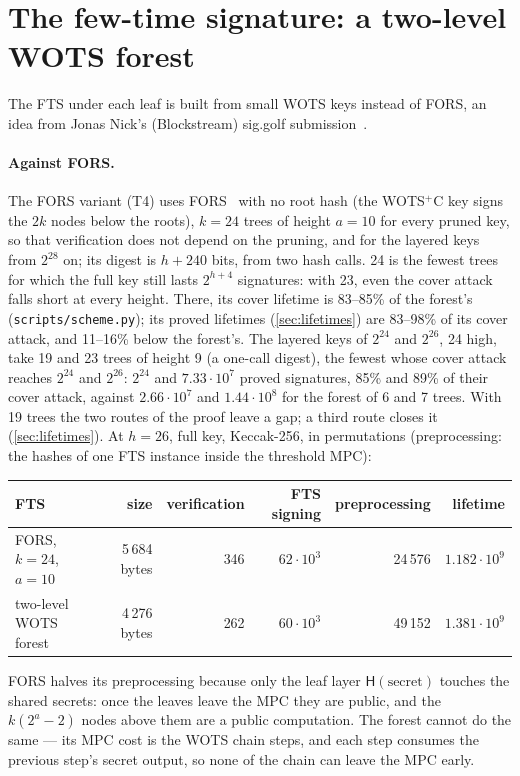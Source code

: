 \documentclass[11pt]{article}
\newcommand{\hash}{\mathsf{H}}
\begin{document}
\section{The few-time signature: a two-level WOTS forest}
\label{sec:twolevel}

The FTS under each leaf is built from small WOTS keys instead of FORS, an idea from Jonas Nick's (Blockstream)
sig.golf submission~\cite{siggolf}.

\paragraph{Against FORS.} The FORS variant (T4) uses FORS~\cite{FIPS205} with no root hash (the WOTS$^+$C key signs
the $2k$ nodes below the roots), $k=24$ trees of height $a=10$ for every pruned key, so that verification does
not depend on the pruning, and for the layered keys from $2^{28}$ on; its digest is $h+240$ bits, from two hash calls.
24 is the fewest trees for which the full key still lasts $2^{h+4}$ signatures: with 23, even the cover attack falls
short at every height. There, its cover lifetime is 83--85\% of the forest's (\texttt{scripts/scheme.py}); its proved
lifetimes (\cref{sec:lifetimes}) are 83--98\% of its cover attack, and 11--16\% below the forest's. The layered keys
of $2^{24}$ and $2^{26}$, 24 high, take 19 and 23 trees of height 9 (a one-call digest), the fewest whose cover
attack reaches $2^{24}$ and $2^{26}$: $2^{24}$ and $7.33\cdot10^7$ proved signatures, 85\% and 89\% of their cover
attack, against $2.66\cdot10^7$ and $1.44\cdot10^8$ for the forest of 6 and 7 trees. With 19 trees the two routes of
the proof leave a gap; a third route closes it (\cref{sec:lifetimes}). At $h=26$, full key,
Keccak-256, in permutations (preprocessing: the hashes of one FTS instance inside the threshold MPC):
\begin{center}
\setlength{\tabcolsep}{4pt}
\begin{tabular}{lrrrrr}
  \toprule
  FTS & size & verification & FTS signing & preprocessing & lifetime \\
  \midrule
  FORS, $k=24$, $a=10$ & 5\,684 bytes & 346 & $62\cdot10^3$ & 24\,576 & $1.182\cdot10^9$ \\
  two-level WOTS forest & 4\,276 bytes & 262 & $60\cdot10^3$ & 49\,152 & $1.381\cdot10^9$ \\
  \bottomrule
\end{tabular}
\end{center}
FORS halves its preprocessing because only the leaf layer $\hash(\text{secret})$ touches the shared secrets:
once the leaves leave the MPC they are public, and the $k(2^a-2)$ nodes above them are a public computation.
The forest cannot do the same --- its MPC cost is the WOTS chain steps, and each step consumes the previous
step's secret output, so none of the chain can leave the MPC early.
\end{document}
